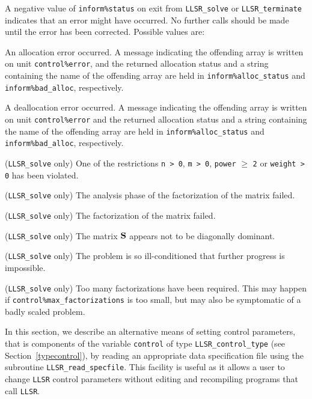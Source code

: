 \documentclass{galahad}
\newcommand{\packagename}{LLSR}
\begin{document}

\galerrors
A negative value of  {\tt inform\%status} on exit from
{\tt \packagename\_solve}
or
{\tt \packagename\_terminate}
indicates that an error might have occurred. No further calls should be made
until the error has been corrected. Possible values are:

\begin{description}
 An allocation error occurred. A message indicating
the offending
array is written on unit {\tt control\%error}, and the returned allocation
status and a string containing the name of the offending array
are held in {\tt inform\%alloc\_\-status}
and {\tt inform\%bad\_alloc}, respectively.

 A deallocation error occurred.
A message indicating the offending
array is written on unit {\tt control\%error} and the returned allocation
status and a string containing the name of the offending array
are held in {\tt inform\%alloc\_\-status}
and {\tt inform\%bad\_alloc}, respectively.

 ({\tt \packagename\_solve} only)
One of the restrictions
{\tt n > 0},
{\tt m > 0},
{\tt power} $\geq$ {\tt 2}
or
{\tt weight > 0}
has been violated.

 ({\tt \packagename\_solve} only)
The analysis phase of the factorization of the matrix  failed.

 ({\tt \packagename\_solve} only)
The factorization of the matrix  failed.

 ({\tt \packagename\_solve} only)
The matrix ${\mathbf{S}}$ appears not to be diagonally dominant.

 ({\tt \packagename\_solve} only)
The problem is so ill-conditioned that further progress is impossible.

 ({\tt \packagename\_solve} only)
 Too many factorizations have been required.  This may happen if
    {\tt control\%max\_factorizations} is too small,
    but may also be symptomatic of a badly scaled problem.

\end{description}


\galfeatures
\noindent In this section, we describe an alternative means of setting
control parameters, that is components of the variable {\tt control} of type
{\tt \packagename\_control\_type}
(see Section~\ref{typecontrol}),
by reading an appropriate data specification file using the
subroutine {\tt \packagename\_read\_specfile}. This facility
is useful as it allows a user to change  {\tt \packagename} control parameters
without editing and recompiling programs that call {\tt \packagename}.
\end{document}
